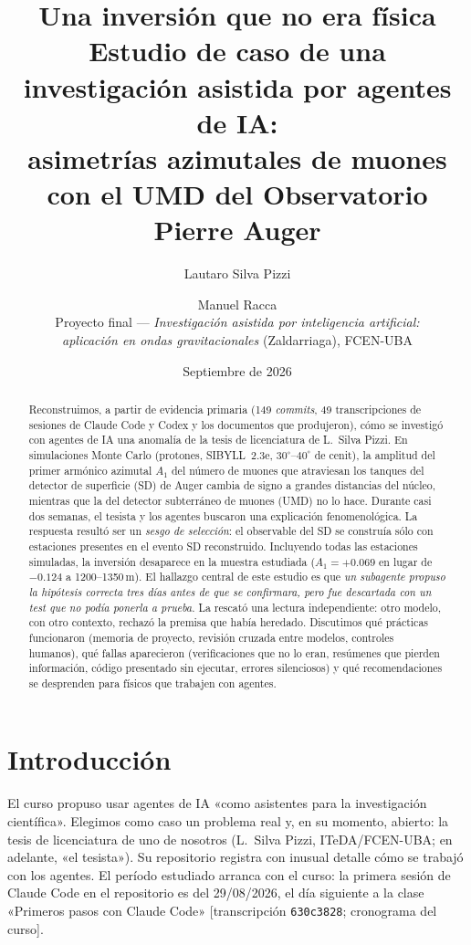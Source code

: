 \documentclass[11pt,a4paper]{article}
\title{\textbf{Una inversión que no era física}\\[4pt]
\large Estudio de caso de una investigación asistida por agentes de IA:\\
asimetrías azimutales de muones con el UMD del Observatorio Pierre Auger}
\author{Lautaro Silva Pizzi \and Manuel Racca\\[2pt]
{\small Proyecto final --- \emph{Investigación asistida por inteligencia artificial:}}\\
{\small \emph{aplicación en ondas gravitacionales} (Zaldarriaga), FCEN-UBA}}
\date{Septiembre de 2026}
\newcommand{\ev}[1]{{\small\color{nota}[#1]}}   %
\newcommand{\code}[1]{\texttt{#1}}
\begin{document}
\maketitle

\begin{abstract}
\noindent
Reconstruimos, a partir de evidencia primaria (149 \emph{commits}, 49 transcripciones de sesiones de
Claude Code y Codex y los documentos que produjeron), cómo se investigó con agentes de IA una anomalía
de la tesis de licenciatura de L.~Silva Pizzi. En simulaciones Monte Carlo (protones, SIBYLL~2.3e,
$30^\circ$--$40^\circ$ de cenit), la amplitud del primer armónico azimutal $A_1$ del número de muones que
atraviesan los tanques del detector de superficie (SD) de Auger cambia de signo a grandes distancias del
núcleo, mientras que la del detector subterráneo de muones (UMD) no lo hace. Durante casi dos semanas, el
tesista y los agentes buscaron una explicación fenomenológica. La respuesta resultó ser un \emph{sesgo de
selección}: el observable del SD se construía sólo con estaciones presentes en el evento SD reconstruido.
Incluyendo todas las estaciones simuladas, la inversión desaparece en la muestra estudiada
($A_1=+0.069$ en lugar de $-0.124$ a 1200--1350\,m). El hallazgo central de este estudio es que
\emph{un subagente propuso la hipótesis correcta tres días antes de que se confirmara, pero fue
descartada con un test que no podía ponerla a prueba}. La rescató una lectura independiente: otro modelo,
con otro contexto, rechazó la premisa que había heredado. Discutimos qué prácticas funcionaron (memoria de
proyecto, revisión cruzada entre modelos, controles humanos), qué fallas aparecieron (verificaciones que no
lo eran, resúmenes que pierden información, código presentado sin ejecutar, errores silenciosos) y qué
recomendaciones se desprenden para físicos que trabajen con agentes.
\end{abstract}

\tableofcontents
\newpage

\section{Introducción}
El curso propuso usar agentes de IA «como asistentes para la investigación científica». Elegimos como caso
un problema real y, en su momento, abierto: la tesis de licenciatura de uno de nosotros (L.~Silva Pizzi,
ITeDA/FCEN-UBA; en adelante, «el tesista»). Su repositorio registra con inusual detalle cómo se trabajó con
los agentes. El período estudiado arranca con el curso: la primera sesión de Claude Code en el repositorio
es del 29/08/2026, el día siguiente a la clase «Primeros pasos con Claude Code» \ev{transcripción
\code{630c3828}; cronograma del curso}.
\end{document}
